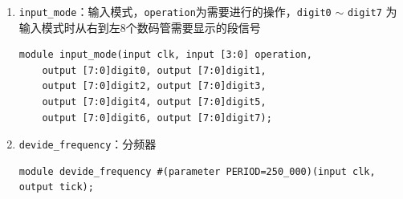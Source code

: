 \documentclass{article}
\begin{document}
\begin{enumerate}
\begin{enumerate}
			\texttt{operation} 为当前需要执行的操作，所有操作均应只持续一个时钟周期，随后恢复为 \texttt{OP\_NONE}
			
			\texttt{op\_detail} 为 7 bit 数据（取值范围 0--127），其含义取决于当前操作：
			\begin{enumerate}
				\item 当修改库存时，\texttt{op\_detail} 表示新的库存数量；
				\item 当修改单价时，\texttt{op\_detail} 表示新的商品单价；
				\item 当执行跳转操作时，\texttt{op\_detail} 表示目标饮料编号；
				\item 当确认购买时，\texttt{op\_detail} 表示用户当前余额；
				\item 其余操作下忽略该参数。
			\end{enumerate}
			
			\texttt{profit} 为总销售额（13 bit，取值范围 0--8191）。
			
			\texttt{warning} 为报错信号。当发生错误时，该信号在一个时钟周期内被置为 1，随后自动恢复为 0
			
			\texttt{digit0} $\sim$ \texttt{digit7} 为当前 8 个数码管应显示的段选信号
			
			\begin{verbatim}
module drink_list(input clk, input manager,
	input [2:0] operation, input [6:0]op_detail,
	output [12:0]profit, output warning,
	output [7:0]digit0, output [7:0]digit1,
	output [7:0]digit2, output [7:0]digit3,
	output [7:0]digit4, output [7:0]digit5,
	output [7:0]digit6, output [7:0]digit7);
			\end{verbatim}
		
		
		\item \texttt{input\_mode}：输入模式，\texttt{operation}为需要进行的操作，\texttt{digit0} $\sim$ \texttt{digit7} 为输入模式时从右到左8个数码管需要显示的段信号
			\begin{verbatim}
module input_mode(input clk, input [3:0] operation,
	output [7:0]digit0, output [7:0]digit1,
	output [7:0]digit2, output [7:0]digit3,
	output [7:0]digit4, output [7:0]digit5,
	output [7:0]digit6, output [7:0]digit7);
			\end{verbatim}
		
		\item \texttt{devide\_frequency}：分频器
			\begin{verbatim}
module devide_frequency #(parameter PERIOD=250_000)(input clk, output tick);
			\end{verbatim}
	\end{enumerate}
\end{enumerate}
\end{document}
